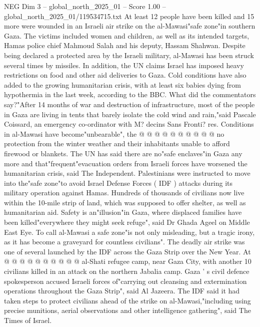 \begin{textsample}{NEG Dim 3 – global\_north\_2025\_01 – Score 1.00 – global\_north\_2025\_01/119534715.txt}  \label{ex:f3_neg_219}
At least 12 people have been killed and 15 more were wounded in an Israeli air strike on the al-Mawasi"safe zone"in southern Gaza.
The victims included women and children, as well as its intended targets, Hamas police chief Mahmoud Salah and his deputy, Hassam Shahwan.
Despite being declared a protected area by the Israeli military, al-Mawasi has been struck several times by missiles.
In addition, the UN claims Israel has imposed heavy restrictions on food and other aid deliveries to Gaza.
Cold conditions have also added to the growing humanitarian crisis, with at least six babies dying from hypothermia in the last week, according to the BBC.
What did the commentators say?"After 14 months of war and destruction of infrastructure, most of the people in Gaza are living in tents that barely isolate the cold wind and rain,"said Pascale Coissard, an emergency co-ordinator with M? decins Sans Fronti? res.
Conditions in al-Mawasi have become"unbearable", the @ @ @ @ @ @ @ @ @ @ no protection from the winter weather and their inhabitants unable to afford firewood or blankets.
The UN has said there are no"safe enclaves"in Gaza any more and that"frequent"evacuation orders from Israeli forces have worsened the humanitarian crisis, said The Independent.
Palestinians were instructed to move into the"safe zone"to avoid Israel Defense Forces ( IDF ) attacks during its military operation against Hamas.
Hundreds of thousands of civilians now live within the 10-mile strip of land, which was supposed to offer shelter, as well as humanitarian aid.
Safety is an"illusion"in Gaza, where displaced families have been killed"everywhere they might seek refuge", said Dr Ghada Ageel on Middle East Eye.
To call al-Mawasi a safe zone"is not only misleading, but a tragic irony, as it has become a graveyard for countless civilians".
The deadly air strike was one of several launched by the IDF across the Gaza Strip over the New Year.
At @ @ @ @ @ @ @ @ @ @ al-Shati refugee camp, near Gaza City, with another 10 civilians killed in an attack on the northern Jabalia camp.
Gaza ' s civil defence spokesperson accused Israeli forces of"carrying out cleansing and extermination operations throughout the Gaza Strip", said Al Jazeera.
The IDF said it had taken steps to protect civilians ahead of the strike on al-Mawasi,"including using precise munitions, aerial observations and other intelligence gathering", said The Times of Israel.

\end{textsample}
